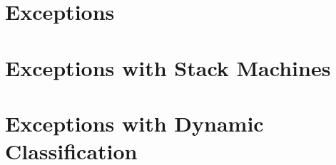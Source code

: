 \section{Exceptions}







\break

\section{Exceptions with Stack Machines}







\break

\section{Exceptions with Dynamic Classification}






